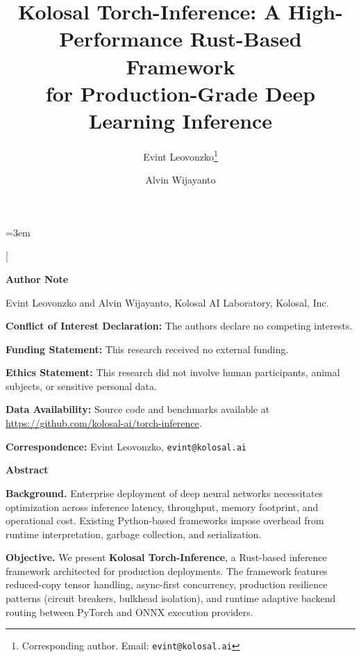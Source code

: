 \documentclass[10pt,twocolumn,a4paper]{article}
\title{\textbf{Kolosal Torch-Inference: A High-Performance Rust-Based Framework\\for Production-Grade Deep Learning Inference}}
\author[1]{Evint Leovonzko\thanks{Corresponding author. Email: \texttt{evint@kolosal.ai}}}
\author[1]{Alvin Wijayanto}
\affil[1]{Kolosal AI Laboratory, Kolosal, Inc.}
\date{}
\theoremstyle{definition}
\theoremstyle{plain}
\begin{document}
\emergencystretch=3em

\twocolumn[
\begin{minipage}{\textwidth}
\maketitle

\begin{center}
\textbf{Author Note}
\end{center}

\noindent Evint Leovonzko and Alvin Wijayanto, Kolosal AI Laboratory, Kolosal, Inc.

\vspace{0.3em}
\noindent \textbf{Conflict of Interest Declaration:} The authors declare no competing interests.

\vspace{0.3em}
\noindent \textbf{Funding Statement:} This research received no external funding.

\vspace{0.3em}
\noindent \textbf{Ethics Statement:} This research did not involve human participants, animal subjects, or sensitive personal data.

\vspace{0.3em}
\noindent \textbf{Data Availability:} Source code and benchmarks available at \url{https://github.com/kolosal-ai/torch-inference}.

\vspace{0.3em}
\noindent \textbf{Correspondence:} Evint Leovonzko, \texttt{evint@kolosal.ai}

\vspace{0.8em}
\begin{center}
\textbf{Abstract}
\end{center}

\noindent \textbf{Background.} Enterprise deployment of deep neural networks necessitates optimization across inference latency, throughput, memory footprint, and operational cost. Existing Python-based frameworks impose overhead from runtime interpretation, garbage collection, and serialization.

\vspace{0.2em}
\noindent \textbf{Objective.} We present \textbf{Kolosal Torch-Inference}, a Rust-based inference framework architected for production deployments. The framework features reduced-copy tensor handling, async-first concurrency, production resilience patterns (circuit breakers, bulkhead isolation), and runtime adaptive backend routing between PyTorch and ONNX execution providers.


\end{minipage}
\end{document}
